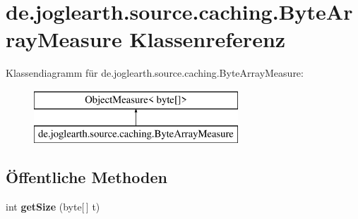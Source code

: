 \section{de.\-joglearth.\-source.\-caching.\-Byte\-Array\-Measure Klassenreferenz}
\label{classde_1_1joglearth_1_1source_1_1caching_1_1_byte_array_measure}
Klassendiagramm für de.\-joglearth.\-source.\-caching.\-Byte\-Array\-Measure\-:\begin{figure}[H]
\begin{center}
\leavevmode
\includegraphics[height=2.000000cm]{classde_1_1joglearth_1_1source_1_1caching_1_1_byte_array_measure}
\end{center}
\end{figure}
\subsection*{Öffentliche Methoden}
\begin{DoxyCompactItemize}
\item 
int {\bfseries get\-Size} (byte[$\,$] t)\label{classde_1_1joglearth_1_1source_1_1caching_1_1_byte_array_measure_a637b140ddd22755079baf47401d8fa7f}

\end{DoxyCompactItemize}
